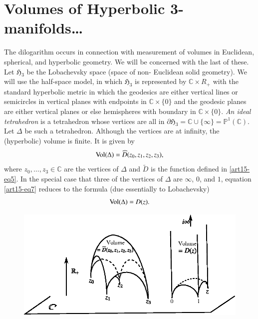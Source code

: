 \section{Volumes of Hyperbolic 3-manifolds\ldots}\label{art15-sec4}\pageoriginale
The dilogarithm occurs in connection with measurement of volumes in Euclidean, spherical, and hyperbolic geometry. We will be concerned with the last of these. Let $\mathfrak{H}_{3}$ be the Lobachevsky space (space of non- Euclidean solid geometry). We will use the half-space model, in which $\mathfrak{H}_{3}$ is represented by $\mathbb{C}\times R_{+}$ with the standard hyperbolic metric in which the geodesics are either vertical lines or semicircles in vertical planes with endpoints in $\mathbb{C}\times \{0\}$ and the geodesic planes are either vertical planes or else hemispheres with boundary in $\mathbb{C}\times \{0\}$. {\em An ideal tetrahedron} is a tetrahedron whose vertices are all in $\partial \mathfrak{H}_{3}=\mathbb{C}\cup \{\infty\}=\mathbb{P}^{1}(\mathbb{C})$. Let $\Delta$ be such a tetrahedron. Although the vertices are at infinity, the (hyperbolic) volume is finite. It is given by
\begin{equation}
\operatorname{Vol} (\Delta)=\widehat{D}(z_{0},z_{1},z_{2},z_{3}),\label{art15-eq7}
\end{equation}
where $z_{0},\ldots,z_{3}\in\mathbb{C}$ are the vertices of $\Delta$ and $\widetilde{D}$ is the function defined in \eqref{art15-eq5}. In the special case that three of the vertices of $\Delta$ are $\infty$, $0$, and $1$, equation \eqref{art15-eq7} reduces to the formula (due essentially to Lobachevsky)
\begin{equation}
\operatorname{Vol} (\Delta)=D(z).\label{art15-eq8}
\end{equation}
\begin{figure}[H]
\centering
\includegraphics{figures/fig4.eps}
\end{figure}

